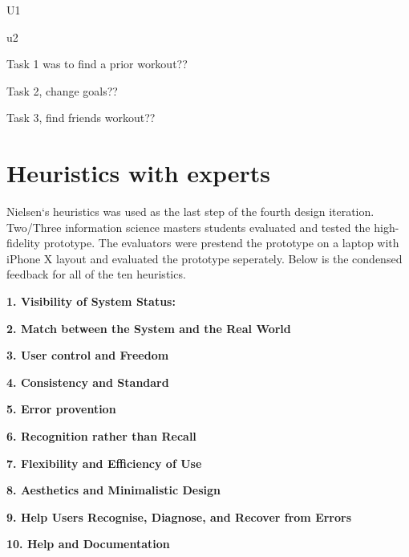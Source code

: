 U1

u2

Task 1 was to find a prior workout??

Task 2, change goals??

Task 3, find friends workout??

\section{Heuristics with experts}\label{heur}
Nielsen`s heuristics was used as the last step of the fourth design iteration. Two/Three information science masters students evaluated and tested the high-fidelity prototype. The evaluators were prestend the prototype on a laptop with iPhone X layout and evaluated the prototype seperately. Below is the condensed feedback for all of the ten heuristics.

\textbf{1. Visibility of System Status:}

\textbf{2. Match between the System and the Real World}

\textbf{3. User control and Freedom}

\textbf{4. Consistency and Standard}

\textbf{5. Error provention}

\textbf{6. Recognition rather than Recall}

\textbf{7. Flexibility and Efficiency of Use}

\textbf{8. Aesthetics and Minimalistic Design}

\textbf{9. Help Users Recognise, Diagnose, and Recover from Errors}

\textbf{10. Help and Documentation}


